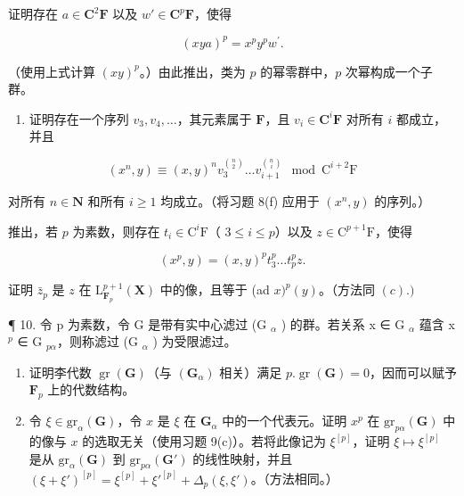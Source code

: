 证明存在 \(a \in \mathbf{C}^2\mathbf{F}\) 以及 \(w' \in \mathbf{C}^p\mathbf{F}\)，使得

\[
(x y a) ^ {p} = x ^ {p} y ^ {p} w ^ {\prime}.
\]

（使用上式计算 \((xy)^p\)。）由此推出，类为 \(p\) 的幂零群中，\(p\) 次幂构成一个子群。

\begin{enumerate}
\def\labelenumi{(\alph{enumi})}
\setcounter{enumi}{3}
\tightlist
\item
  证明存在一个序列 \(v_{3}, v_{4}, \ldots\)，其元素属于 \(\mathbf{F}\)，且 \(v_{i} \in \mathbf{C}^{i}\mathbf{F}\) 对所有 \(i\) 都成立，并且
\end{enumerate}

\[
(x ^ {n}, y) \equiv (x, y) ^ {n} v _ {3} ^ {\binom {n} {2}} \dots v _ {i + 1} ^ {\binom {n} {i}} \mod \mathrm{C} ^ {i + 2} \mathrm{F}
\]

对所有 \(n \in \mathbf{N}\) 和所有 \(i \geqslant 1\) 均成立。（将习题 8(f) 应用于 \((x^n, y)\) 的序列。）

推出，若 \(p\) 为素数，则存在 \(t_i \in \mathrm{C}^i\mathrm{F}\)（ \(3 \leqslant i \leqslant p\)）以及 \(z \in \mathrm{C}^{p+1}\mathrm{F}\)，使得

\[
(x ^ {p}, y) = (x, y) ^ {p} t _ {3} ^ {p} \dots t _ {p} ^ {p} z.
\]

证明 \(\bar{z}_p\) 是 \(z\) 在 \(\mathrm{L}_{\mathbf{F}_p}^{p + 1}(\mathbf{X})\) 中的像，且等于 (ad \(x)^p (y)\)。（方法同 \((c).)\)

¶ 10. 令 p 为素数，令 G 是带有实中心滤过 (G \(_{\alpha}\) ) 的群。若关系 x ∈ G \(_{\alpha}\) 蕴含 x \(^{p}\) ∈ G \(_{p\alpha}\)，则称滤过 (G \(_{\alpha}\) ) 为受限滤过。

\begin{enumerate}
\def\labelenumi{(\alph{enumi})}
\item
  证明李代数 \(\operatorname{gr}(\mathbf{G})\)（与 \((\mathbf{G}_{\alpha})\) 相关）满足 \(p.\operatorname{gr}(\mathbf{G}) = 0\)，因而可以赋予 \(\mathbf{F}_p\) 上的代数结构。
\item
  令 \(\xi \in \mathrm{gr}_{\alpha}(\mathbf{G})\)，令 \(x\) 是 \(\xi\) 在 \(\mathbf{G}_{\alpha}\) 中的一个代表元。证明 \(x^{p}\) 在 \(\mathrm{gr}_{p\alpha}(\mathbf{G})\) 中的像与 \(x\) 的选取无关（使用习题 9(c)）。若将此像记为 \(\xi^{[p]}\)，证明 \(\xi \mapsto \xi^{[p]}\) 是从 \(\mathrm{gr}_{\alpha}(\mathbf{G})\) 到 \(\mathrm{gr}_{p\alpha}(\mathbf{G}')\) 的线性映射，并且 \((\xi + \xi')^{[p]} = \xi^{[p]} + \xi'^{[p]} + \Delta_p(\xi, \xi')\)。（方法相同。）
\end{enumerate}

